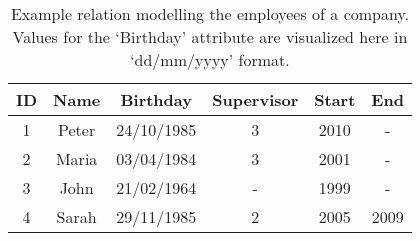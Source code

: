 




\begin{table}
\centering
\caption{Example relation modelling the employees of a company. Values for the `Birthday' attribute are visualized here in `dd/mm/yyyy' format.}
\begin{tabular}{c c c c c c }
\hline
\textbf{ID} & \textbf{Name} & \textbf{Birthday} & \textbf{Supervisor} & \textbf{Start} & \textbf{End} \\ \hline
1 & Peter & 24/10/1985 & 3 &  2010 & - \\
2 & Maria & 03/04/1984 & 3 & 2001 & - \\
3 & John & 21/02/1964 & - &  1999 & - \\
4 & Sarah & 29/11/1985 & 2 &  2005 & 2009 \\
\hline 
\end{tabular}
\label{table:example-database}



\end{table}

